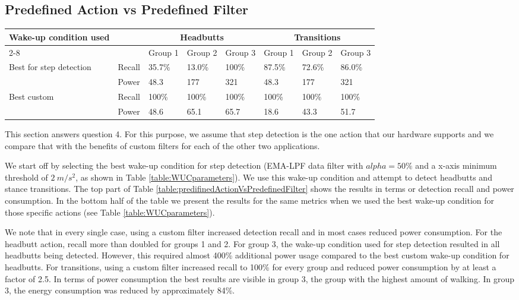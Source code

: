 \subsection{Predefined Action vs Predefined Filter}

\begin{table*}[t]
    \begin{tabular}{|l|l|l|l|l|l|l|l|}
    \hline
    \multirow{2}{*}{ Wake-up condition used}
							& \multirow{2}{*}{~}	& \multicolumn{3}{c|}{Headbutts} 	& \multicolumn{3}{c|}{Transitions} 	\\ \cline{2-8}
							&						& Group 1 	& Group 2	& Group 3 	& Group 1 	& Group 2	& Group 3 	\\ \hline
    \multirow{2}{*}{Best for step detection}
							& Recall 				& 35.7\%  	& 13.0\%    & 100\%  	& 87.5\% 	& 72.6\%	& 86.0\%  	\\ \cline{2-8}
							& Power  				& 48.3 		& 177       & 321     	& 48.3 		& 177		& 321     	\\ \hline
    \multirow{2}{*}{Best custom}
							& Recall 				& 100\%   	& 100\%     & 100\%   	& 100\%   	& 100\%		& 100\%   	\\ \cline{2-8}
							& Power  				& 48.6   	& 65.1      & 65.7    	& 18.6    	& 43.3		& 51.7    	\\ \hline
    \end{tabular}
	\caption{Detection recall and power consumption for the Headbutts and Transitions actions using fixed or custom wake-up conditions}
	\label{table:predifinedActionVsPredefinedFilter}
\end{table*}

This section answers question 4. For this purpose, we assume that step detection is the one action that our hardware supports and we compare that with the benefits of custom filters for each of the other two applications. 

We start off by selecting the best wake-up condition for step detection (EMA-LPF data filter with $alpha = 50\%$ and a x-axis minimum threshold of $2\:m/s^2$, as shown in Table \ref{table:WUCparameters}). We use this wake-up condition and attempt to detect headbutts and stance transitions. The top part of Table \ref{table:predifinedActionVsPredefinedFilter} shows the results in terms or detection recall and power consumption. In the bottom half of the table we present the results for the same metrics when we used the best wake-up condition for those specific actions (see Table \ref{table:WUCparameters}). 

We note that in every single case, using a custom filter increased detection recall and in most cases reduced power consumption. For the headbutt action, recall more than doubled for groups 1 and 2. For group 3, the wake-up condition used for step detection resulted in all headbutts being detected. However, this required almost 400\% additional power usage compared to the best custom wake-up condition for headbutts. For transitions, using a custom filter increased recall to 100\% for every group and reduced power consumption by at least a factor of 2.5. In terms of power consumption the best results are visible in group 3, the group with the highest amount of walking. In group 3, the energy consumption was reduced by approximately 84\%.

